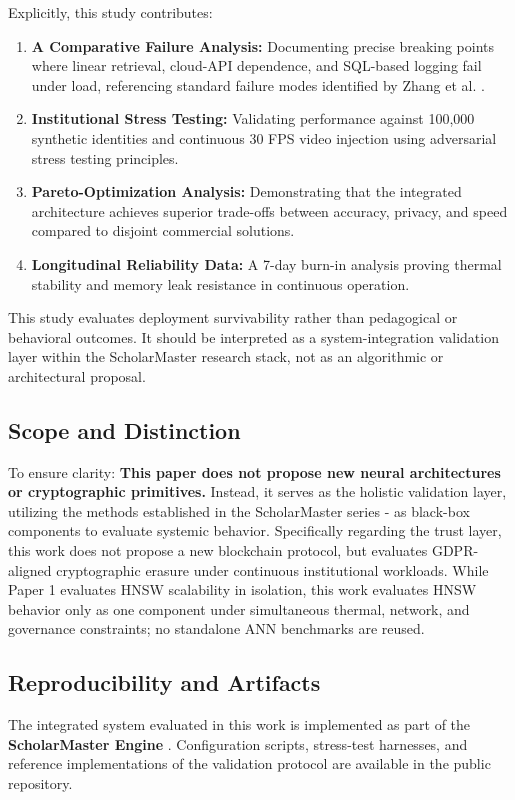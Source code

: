 \documentclass[conference]{IEEEtran}
\begin{document}
Explicitly, this study contributes:
\begin{enumerate}
    \item \textbf{A Comparative Failure Analysis:} Documenting precise breaking points where linear retrieval, cloud-API dependence, and SQL-based logging fail under load, referencing standard failure modes identified by Zhang et al. \cite{b10}.
    \item \textbf{Institutional Stress Testing:} Validating performance against 100,000 synthetic identities and continuous 30 FPS video injection using adversarial stress testing principles.
    \item \textbf{Pareto-Optimization Analysis:} Demonstrating that the integrated architecture achieves superior trade-offs between accuracy, privacy, and speed compared to disjoint commercial solutions.
    \item \textbf{Longitudinal Reliability Data:} A 7-day burn-in analysis proving thermal stability and memory leak resistance in continuous operation.
\end{enumerate}

This study evaluates deployment survivability rather than pedagogical or behavioral outcomes. It should be interpreted as a system-integration validation layer within the ScholarMaster research stack, not as an algorithmic or architectural proposal.

\subsection{Scope and Distinction}
To ensure clarity: \textbf{This paper does not propose new neural architectures or cryptographic primitives.} Instead, it serves as the holistic validation layer, utilizing the methods established in the ScholarMaster series \cite{p1}-\cite{p6} as black-box components to evaluate systemic behavior. Specifically regarding the trust layer, this work does not propose a new blockchain protocol, but evaluates GDPR-aligned cryptographic erasure \cite{b6} under continuous institutional workloads. While Paper 1 evaluates HNSW scalability in isolation, this work evaluates HNSW behavior only as one component under simultaneous thermal, network, and governance constraints; no standalone ANN benchmarks are reused.

\subsection{Reproducibility and Artifacts}
The integrated system evaluated in this work is implemented as part of the \textbf{ScholarMaster Engine} \cite{scholarmaster_repo}. Configuration scripts, stress-test harnesses, and reference implementations of the validation protocol are available in the public repository.
\end{document}
